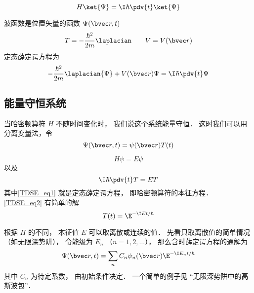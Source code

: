 
\begin{issues}
\issueDraft
\issueAbstract
\end{issues}


\begin{equation}
H \ket{\Psi} = \I\hbar \pdv{t} \ket{\Psi}
\end{equation}


波函数是位置矢量的函数 $\Psi(\bvec r, t)$
\begin{equation}
T = -\frac{\hbar^2}{2m} \laplacian \qquad V = V(\bvec r)
\end{equation}
定态薛定谔方程为
\begin{equation}
-\frac{\hbar^2}{2m} \laplacian {\Psi} + V(\bvec r)\Psi = \I\hbar \pdv{t} \Psi
\end{equation}

\subsection{能量守恒系统}
当哈密顿算符 $H$ 不随时间变化时， 我们说这个系统能量守恒． 这时我们可以用分离变量法，令
\begin{equation}
\Psi(\bvec r, t) = \psi(\bvec r) T(t)
\end{equation}
 
\begin{equation}\label{TDSE_eq1}
H\psi = E\psi
\end{equation}
以及
\begin{equation}\label{TDSE_eq2}
\I \hbar\pdv{t}T = ET
\end{equation}
其中\autoref{TDSE_eq1} 就是定态薛定谔方程， 即哈密顿算符的本征方程． \autoref{TDSE_eq2} 有简单的解
\begin{equation}
T(t) = \E^{-\I E t/\hbar}
\end{equation}

根据 $H$ 的不同， 本征值 $E$ 可以取离散或连续的值． 先看只取离散值的简单情况（如无限深势阱）， 令能级为 $E_n$ （$n = 1, 2, \dots$）， 那么含时薛定谔方程的通解为
\begin{equation}\label{TDSE_eq5}
\Psi(\bvec r, t) = \sum_n C_n \psi_n(\bvec r) \E^{-\I E_n t/\hbar}
\end{equation}
其中 $C_n$ 为待定系数， 由初始条件决定． 一个简单的例子见 “无限深势阱中的高斯波包”．

